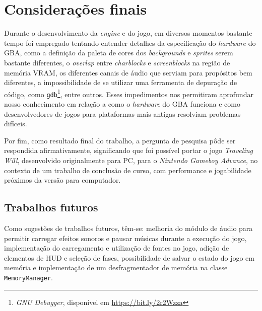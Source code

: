 \chapter[Considerações finais]{Considerações finais}

Durante o desenvolvimento da \textit{engine} e do jogo, em diversos momentos bastante tempo foi empregado tentando entender detalhes da especificação do \textit{hardware} do GBA, como a definição da paleta de cores dos \textit{backgrounds} e \textit{sprites} serem bastante diferentes, o \textit{overlap} entre \textit{charblocks} e \textit{screenblocks} na região de memória VRAM, os diferentes canais de áudio que serviam para propósitos bem diferentes, a impossibilidade de se utilizar uma ferramenta de depuração de código, como \texttt{gdb}\footnote{\textit{GNU Debugger}, disponível em \url{https://bit.ly/2r2Wzza}}, entre outros. Esses impedimentos nos permitiram aprofundar nosso conhecimento em relação a como o \textit{hardware} do GBA funciona e como desenvolvedores de jogos para plataformas mais antigas resolviam problemas difíceis.

Por fim, como resultado final do trabalho, a pergunta de pesquisa pôde ser respondida afirmativamente, significando que foi possível portar o jogo \textit{Traveling Will}, desenvolvido originalmente para PC, para o \textit{Nintendo Gameboy Advance}, no contexto de um trabalho de conclusão de curso, com performance e jogabilidade próximos da versão para computador.

\section{Trabalhos futuros}

Como sugestões de trabalhos futuros, têm-se: melhoria do módulo de áudio para permitir carregar efeitos sonoros e pausar músicas durante a execução do jogo, implementação do carregamento e utilização de fontes no jogo, adição de elementos de HUD e seleção de fases, possibilidade de salvar o estado do jogo em memória e implementação de um desfragmentador de memória na classe \texttt{MemoryManager}.
